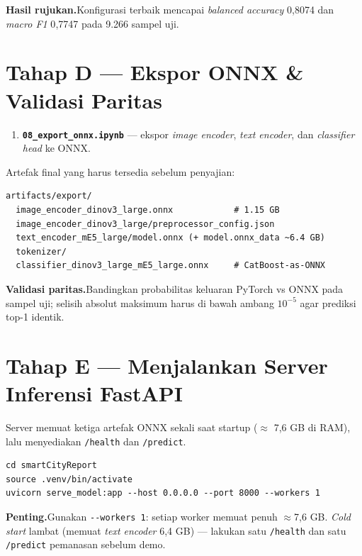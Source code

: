 \documentclass[11pt,a4paper]{article}
\newcommand{\code}[1]{\texttt{\small #1}}
\newcommand{\stage}[2]{%
  \par\medskip\noindent\colorbox{stagebg}{\parbox{\dimexpr\linewidth-2\fboxsep}{%
  \textbf{\color{accent}#1}\;\;#2}}\par\smallskip}
\begin{document}
\stage{Hasil rujukan.}{Konfigurasi terbaik mencapai \emph{balanced accuracy} 0{,}8074 dan \emph{macro F1} 0{,}7747 pada 9.266 sampel uji.}

\section{Tahap D — Ekspor ONNX \& Validasi Paritas}
\begin{enumerate}[leftmargin=1.6em,itemsep=3pt]
  \item \textbf{\code{08\_export\_onnx.ipynb}} — ekspor \emph{image encoder},
        \emph{text encoder}, dan \emph{classifier head} ke ONNX.
\end{enumerate}

Artefak final yang harus tersedia sebelum penyajian:
\begin{lstlisting}
artifacts/export/
  image_encoder_dinov3_large.onnx            # 1.15 GB
  image_encoder_dinov3_large/preprocessor_config.json
  text_encoder_mE5_large/model.onnx (+ model.onnx_data ~6.4 GB)
  tokenizer/
  classifier_dinov3_large_mE5_large.onnx     # CatBoost-as-ONNX
\end{lstlisting}

\stage{Validasi paritas.}{Bandingkan probabilitas keluaran PyTorch vs ONNX pada sampel uji; selisih absolut maksimum harus di bawah ambang $10^{-5}$ agar prediksi top-1 identik.}

\section{Tahap E — Menjalankan Server Inferensi FastAPI}
Server memuat ketiga artefak ONNX sekali saat startup (\(\approx\) 7{,}6 GB di RAM),
lalu menyediakan \code{/health} dan \code{/predict}.

\begin{lstlisting}
cd smartCityReport
source .venv/bin/activate
uvicorn serve_model:app --host 0.0.0.0 --port 8000 --workers 1
\end{lstlisting}

\stage{Penting.}{Gunakan \code{-{}-workers 1}: setiap worker memuat penuh \(\approx\)7{,}6 GB. \emph{Cold start} lambat (memuat \emph{text encoder} 6{,}4 GB) — lakukan satu \code{/health} dan satu \code{/predict} pemanasan sebelum demo.}
\end{document}
